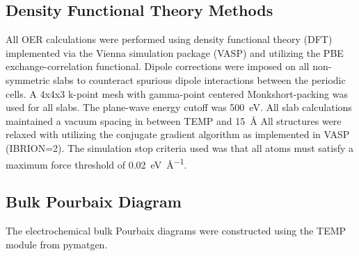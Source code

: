 \subsection{Density Functional Theory Methods}  %
%
%
All OER calculations were performed using density functional theory (DFT) implemented via the Vienna  simulation package (VASP)
\cite{Kresse1995,Kresse1996_0,Kresse1996_1}
and utilizing the PBE exchange-correlation functional\cite{Perdew1996}.
%
Dipole corrections were imposed on all non-symmetric slabs to counteract spurious dipole interactions between the periodic cells.\cite{Neugebauer1992}
%
A 4x4x3 k-point mesh with gamma-point centered Monkshort-packing\cite{Monkhorst1976} was used for all slabs.
%
The plane-wave energy cutoff was \SI{500}{\electronvolt}.
%
All slab calculations maintained a vacuum spacing in between TEMP and \SI{15}{\angstrom}
%
All structures were relaxed with utilizing the conjugate gradient algorithm as implemented in VASP (IBRION\num{=2}).
%
The simulation stop criteria used was that all atoms must satisfy a maximum force threshold of \SI{0.02}{\electronvolt\per\angstrom}.


\subsection{Bulk Pourbaix Diagram}  %
%
The electrochemical bulk Pourbaix diagrams were constructed using the TEMP module from pymatgen.

